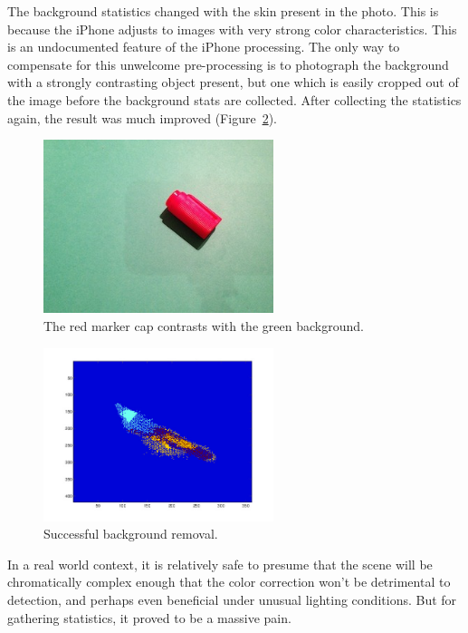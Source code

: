 The background statistics changed with the skin present in the photo. This is because the iPhone adjusts to images with very strong color characteristics. This is an undocumented feature of the iPhone processing. The only way to compensate for this unwelcome pre-processing is to photograph the background with a strongly contrasting object present, but one which is easily cropped out of the image before the background stats are collected. After collecting the statistics again, the result was much improved (Figure~\ref{fig:BGSuccess}).

\begin{figure}[h!]
  \centering
    \includegraphics[width=0.60\textwidth]{Chapter3/Figs/bg_cap.jpg}
    \caption{The red marker cap contrasts with the green background.}  \label{fig:BGCap}
\end{figure}

\begin{figure}[h!]
  \centering
    \includegraphics[width=0.60\textwidth]{Chapter3/Figs/xy_bg_success.jpg}
    \caption{Successful background removal.}  \label{fig:BGSuccess}
\end{figure}

In a real world context, it is relatively safe to presume that the scene will be chromatically complex enough that the color correction won't be detrimental to detection, and perhaps even beneficial under unusual lighting conditions. But for gathering statistics, it proved to be a massive pain.


